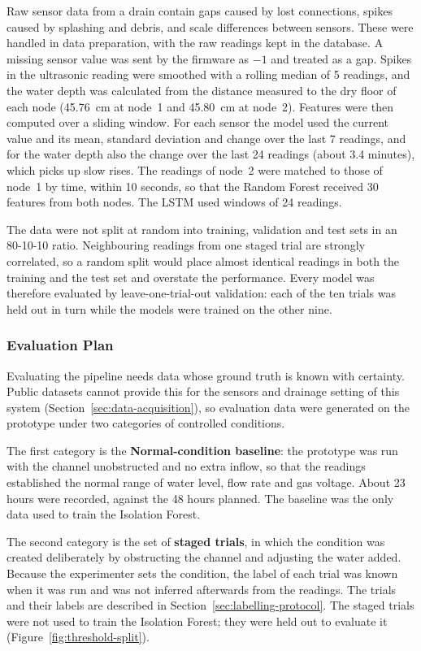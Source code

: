 \documentclass[12pt, a4paper]{article}
\begin{document}
Raw sensor data from a drain contain gaps caused by lost connections, spikes caused by splashing and debris, and scale differences between sensors. These were handled in data preparation, with the raw readings kept in the database. A missing sensor value was sent by the firmware as $-1$ and treated as a gap. Spikes in the ultrasonic reading were smoothed with a rolling median of 5 readings, and the water depth was calculated from the distance measured to the dry floor of each node (45.76~cm at node~1 and 45.80~cm at node~2). Features were then computed over a sliding window. For each sensor the model used the current value and its mean, standard deviation and change over the last 7 readings, and for the water depth also the change over the last 24 readings (about 3.4 minutes), which picks up slow rises. The readings of node~2 were matched to those of node~1 by time, within 10 seconds, so that the Random Forest received 30 features from both nodes. The LSTM used windows of 24 readings.

The data were not split at random into training, validation and test sets in an 80-10-10 ratio. Neighbouring readings from one staged trial are strongly correlated, so a random split would place almost identical readings in both the training and the test set and overstate the performance. Every model was therefore evaluated by leave-one-trial-out validation: each of the ten trials was held out in turn while the models were trained on the other nine.

\subsubsection{Evaluation Plan}
\label{sec:evaluation-plan}

Evaluating the pipeline needs data whose ground truth is known with certainty. Public datasets cannot provide this for the sensors and drainage setting of this system (Section~\ref{sec:data-acquisition}), so evaluation data were generated on the prototype under two categories of controlled conditions.

The first category is the \textbf{Normal-condition baseline}: the prototype was run with the channel unobstructed and no extra inflow, so that the readings established the normal range of water level, flow rate and gas voltage. About 23 hours were recorded, against the 48 hours planned. The baseline was the only data used to train the Isolation Forest.

The second category is the set of \textbf{staged trials}, in which the condition was created deliberately by obstructing the channel and adjusting the water added. Because the experimenter sets the condition, the label of each trial was known when it was run and was not inferred afterwards from the readings. The trials and their labels are described in Section~\ref{sec:labelling-protocol}. The staged trials were not used to train the Isolation Forest; they were held out to evaluate it (Figure~\ref{fig:threshold-split}).
\end{document}
